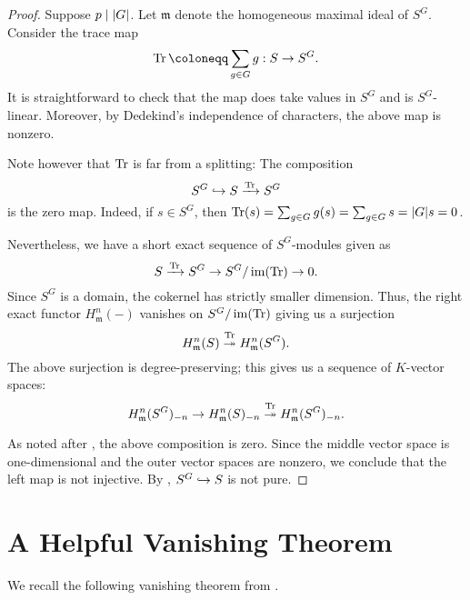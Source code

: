 \documentclass[12pt]{article}
\begin{document}
\begin{proof} 
	Suppose $p \mid {\left\lvert G \right\lvert}$. Let $\mathfrak{m}$ denote the homogeneous maximal ideal of $S^{G}$. Consider the trace map
	\begin{equation*} 
		\Tr \coloneqq \sum_{g \in G} g : S \to S^{G}.
	\end{equation*}
	It is straightforward to check that the map does take values in $S^{G}$ and is $S^{G}$-linear. Moreover, by Dedekind's independence of characters, the above map is nonzero. 

	Note however that $\operatorname{Tr}$ is far from a splitting: The composition
	\begin{equation} \label{eq:inclusion-trace-composition}
		S^{G} \hookrightarrow S \xrightarrow{\operatorname{Tr}} S^{G}
	\end{equation}
	is the zero map. Indeed, if $s \in S^{G}$, then $\operatorname{Tr}(s) = \sum_{g \in G} g(s) = \sum_{g \in G} s = {\left\lvert G \right\lvert} s = 0$.

	Nevertheless, we have a short exact sequence of $S^{G}$-modules given as
	\begin{equation*} 
		S \xrightarrow{\operatorname{Tr}} S^{G} \to S^{G}/\operatorname{im}(\operatorname{Tr}) \to 0.
	\end{equation*}
	Since $S^{G}$ is a domain, the cokernel has strictly smaller dimension. Thus, the right exact functor $H_{\mathfrak{m}}^{n}(-)$ vanishes on $S^{G}/\operatorname{im}(\operatorname{Tr})$ giving us a surjection
	\begin{equation*} 
		H_{\mathfrak{m}}^{n}(S) \overset{\operatorname{Tr}}{\twoheadrightarrow} H_{\mathfrak{m}}^{n}(S^{G}).
	\end{equation*}
	The above surjection is degree-preserving; this gives us a sequence of $K$-vector spaces:
	\begin{equation*} 
		H_{\mathfrak{m}}^{n}(S^{G})_{-n} \to H_{\mathfrak{m}}^{n}(S)_{-n} \overset{\operatorname{Tr}}{\twoheadrightarrow} H_{\mathfrak{m}}^{n}(S^{G})_{-n}.
	\end{equation*}

	As noted after , the above composition is zero. Since the middle vector space is one-dimensional and the outer vector spaces are nonzero, we conclude that the left map is not injective. By , $S^{G} \hookrightarrow S$ is not pure.
\end{proof}

\section{A Helpful Vanishing Theorem}

We recall the following vanishing theorem from \cite[Proposition~III.4.1]{PeskineSzpiro}.
\end{document}
